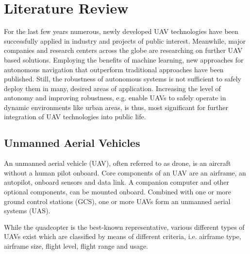 
\chapter{Literature Review} %

\label{Chapter2} %

For the last few years
numerous, newly developed
UAV technologies have been
successfully applied in 
industry and
projects of public interest.
Meanwhile, 
major companies and
research centers across the globe
are researching on further UAV based solutions.
Employing the benefits of machine learning, 
new approaches for autonomous navigation
that outperform traditional approaches 
have been published.
Still, the robustness
of autonomous systems 
is not sufficient to
safely deploy them in many, desired
areas of application. 
Increasing the level of autonomy and
improving robustness,
e.g. enable UAVs to safely operate in 
dynamic environments like urban areas,
is thus, most significant
for further 
integration of
UAV technologies
into public life.



\section{Unmanned Aerial Vehicles}

An unmanned aerial vehicle (UAV),
often referred to as drone, is an
aircraft without a human pilot onboard.
Core components of an UAV are an airframe,
an autopilot, onboard sensors and 
data link. A companion computer
and other optional components,
can be mounted onboard.
Combined with one or more
ground control stations (GCS),
one or more UAVs form an
unmanned aerial systems (UAS).
\cite{Fahlstrom2012}

While the quadcopter is the best-known representative,
various different types of UAVs exist
which are classified by means of
different criteria, i.e.
airframe type, airframe size, flight level, flight range and usage.


